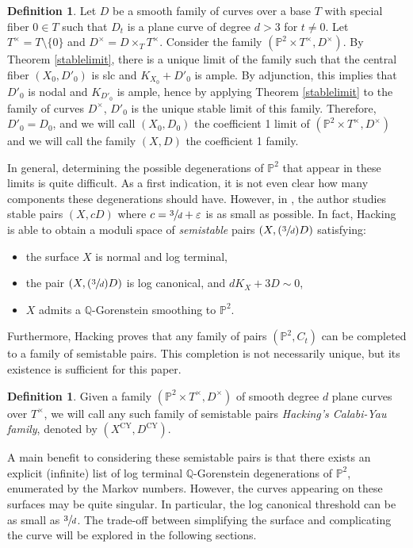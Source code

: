 \documentclass[JEP,XML,SOM,Unicode,NoFloatCountersInSection,published]{cedram}
\newcommand{\Psfrac}[2]{(\sfrac{#1}{#2})}
\let\epsilon\varepsilon
\theoremstyle{plain}
\theoremstyle{definition}
\newtheorem{definition}[theorem]{Definition}
\newcommand\PP{{\mathbb{P}}}
\newcommand\QQ{{\mathbb Q}}
\newcommand\Dcy{{D^{\mathrm{CY}}}}
\newcommand\Xcy{{X^{\mathrm{CY}}}}
\begin{document}
\begin{definition}\label{coefficient1}
Let $D$ be a smooth family of curves over a base $T$ with special fiber $0 \in T$ such that $D_t$ is a plane curve of degree $d > 3$ for $t \ne 0$. Let $T^\times = T \setminus \{0\}$ and $D^\times = D \times_T T^{\times}$. Consider the family $(\PP^2 \times T^\times, D^\times)$. By Theorem \ref{stablelimit}, there is a unique limit of the family such that the central fiber $(X_0, D'_0)$ is slc and $K_{X_0} +D'_0$ is ample. By adjunction, this implies that $D'_0$ is nodal and $K_{D'_0}$ is ample, hence by applying Theorem \ref{stablelimit} to the family of curves $D^\times$, $D'_0$ is the unique stable limit of this family. Therefore, $D'_0 = D_0$, and we will call $(X_0, D_0)$ the coefficient 1 limit of $(\PP^2 \times T^\times, D^\times)$ and we will call the family $(X,D)$ the coefficient 1 family.
\end{definition}

In general, determining the possible degenerations of $\PP^2$ that appear in these limits is quite difficult. As a first indication, it is not even clear how many components these degenerations should have. However, in \cite{Hacking}, the author studies stable pairs $(X, cD)$ where $c = \sfrac{3}{d} + \epsilon$ is as small as possible. In fact, Hacking is able to obtain a moduli space of \textit{semistable} pairs \cite[Def.\,2.4]{Hacking} $(X,\Psfrac{3}{d}D)$ satisfying:
\begin{itemize}
\item the surface $X$ is normal and log terminal,
\item the pair $(X, \Psfrac{3}{d} D)$ is log canonical, and $dK_X + 3D \sim 0$,
\item $X$ admits a $\QQ$-Gorenstein smoothing to $\PP^2$.
\end{itemize}

Furthermore, Hacking proves that any family of pairs $(\PP^2, C_t)$ can be completed to a family of semistable pairs. This completion is not necessarily unique, but its existence is sufficient for this paper.

\begin{definition}
Given a family $(\PP^2 \times T^\times, D^\times)$ of smooth degree $d$ plane curves over $T^\times$, we will call any such family of semistable pairs \textit{Hacking's Calabi-Yau family}, denoted by $(\Xcy, \Dcy)$.
\end{definition}

A main benefit to considering these semistable pairs is that there exists an explicit (infinite) list of log terminal $\QQ$-Gorenstein degenerations of $\PP^2$, enumerated by the Markov numbers. However, the curves appearing on these surfaces may be quite singular. In particular, the log canonical threshold can be as small as $\sfrac{3}{d}$. The trade-off between simplifying the surface and complicating the curve will be explored in the following sections.
\end{document}
